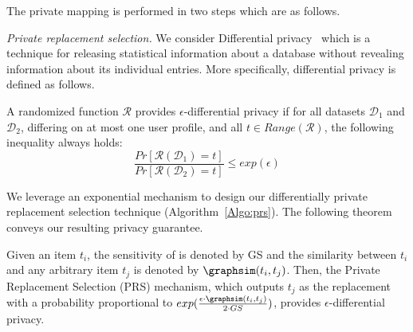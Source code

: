 
 The private mapping is performed in two steps which are as follows.

{\it Private replacement selection.} We consider Differential privacy~\cite{dwork2006calibrating} which is a technique for releasing statistical information about a database without revealing information about its individual entries. More specifically, differential privacy is defined as follows.


\begin{definition}
A randomized function $\mathcal{R}$ provides $\epsilon$-differential privacy if for all datasets $\mathcal{D}_1$ and $\mathcal{D}_2$, differing on at most one user profile, and all $t \in Range(\mathcal{R})$, the following inequality always holds:
$$\frac{Pr[\mathcal{R}(\mathcal{D}_{1} ) = t]}{Pr[\mathcal{R}(\mathcal{D}_{2}) = t]} \le exp(\epsilon)$$
\end{definition}


We leverage an exponential mechanism to design our differentially private replacement selection technique (Algorithm~\ref{Algo:prs}). The following theorem conveys our resulting privacy guarantee.

\begin{theorem}
Given an item $t_i$, the sensitivity of \graphsim is denoted by GS and the similarity between $t_i$ and any arbitrary item $t_j$ is denoted by $\graphsim(t_i,t_j)$. Then, the Private Replacement Selection (PRS) mechanism, which outputs $t_j$ as the replacement with a probability proportional to $exp(\frac{\epsilon \cdot \graphsim (t_i,t_j)}{2 \cdot GS})$, provides $\epsilon$-differential privacy.
\end{theorem}

